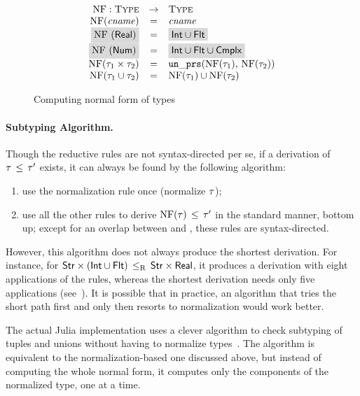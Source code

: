 \begin{figure}
  \[
	\begin{array}{rcl}
	\NF: \Type &\rightarrow& \Type \\
	\NF(\cname) &=& \cname \\
	\colorbox{light-gray}{\NF(\tyreal)} &=&
	\colorbox{light-gray}{\tyunion{\tyint}{\tyflt}} \\
	\colorbox{light-gray}{\NF(\tynum)} &=&
	\colorbox{light-gray}{\tyunion{\tyunion{\tyint}{\tyflt}}{\tycmplx}} \\
	\NF(\typair{\ty_1}{\ty_2}) &=& \unprs(\NF(\ty_1), \, \NF(\ty_2))	\\
	\NF(\tyunion{\ty_1}{\ty_2}) &=& \tyunion{\NF(\ty_1)}{\NF(\ty_2)} \\
	\end{array}
  \]
	\caption{Computing normal form of \BetaJulia types}
	\label{fig:bjsem-calc-nf}
\end{figure}

\paragraph{Subtyping Algorithm.}
Though the reductive rules are not syntax-directed per se,
if a derivation of $\tau \, \leq \, \tau'$ exists,
it can always be found by the following algorithm:
\begin{enumerate}[1)]
  \item use the normalization rule  once (normalize $\tau$);
  \item use all the other rules to derive 
    $\mathop{\mathrm{NF}}(\tau) \, \leq \, \tau'$ in the standard manner, bottom up;
    except for an overlap between  and ,
    these rules are syntax-directed.
\end{enumerate}

However, this algorithm does not always produce the shortest derivation.
For instance, for
$\mathsf{Str} \times (\mathsf{Int} \cup \mathsf{Flt}) \, \leq_\mathrm{R} \, \mathsf{Str} \times \mathsf{Real}$,
it produces a derivation with eight applications of the rules, 
whereas the shortest derivation needs only five applications
(see~).
It is possible that in practice, an algorithm that tries the short path first 
and only then resorts to normalization would work better.

The actual Julia implementation uses a clever algorithm 
to check subtyping of tuples and unions 
without having to normalize types~\cite{bib:Chung19}.
The algorithm is equivalent to the normalization-based one discussed above,
but instead of computing the whole normal form, 
it computes only the components of the normalized type, one at a time.

